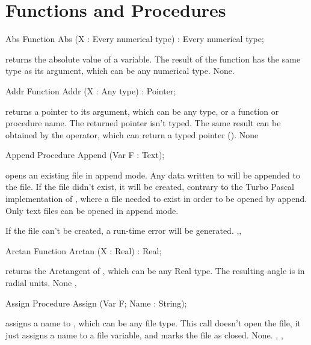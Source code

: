 \documentclass{report}
\begin{document}
\section{Functions and Procedures}
\begin{function}{Abs}
\Declaration
Function Abs (X : Every numerical type) : Every numerical type;

\Description
{} returns the absolute value of a variable. The result of the
function has the same type as its argument, which can be any numerical
type.
\Errors
None.
\SeeAlso
{}
\end{function}
\html{}
\begin{function}{Addr}
\Declaration
Function Addr (X : Any type) : Pointer;

\Description
{} returns a pointer to its argument, which can be any type, or a
function or procedure name. The returned pointer isn't typed.
The same result can be obtained by the  operator, which can return a
typed pointer (\progref).
\Errors
None
\SeeAlso
{}
\end{function}
\html{}
\begin{procedure}{Append}
\Declaration
Procedure Append (Var F : Text);

\Description
{} opens an existing file in append mode. Any data written to
 will be appended to the file. If the file didn't exist, it will be
created, contrary to the Turbo Pascal implementation of , where
a file needed to exist in order to be opened by
append.
Only text files can be opened in append mode.

\Errors
If the file can't be created, a run-time error will be generated.
\SeeAlso
{},, 
\end{procedure}
\html{}
\begin{function}{Arctan}
\Declaration
Function Arctan (X : Real) : Real;

\Description
{} returns the Arctangent of , which can be any Real type.
The resulting angle is in radial units.
\Errors
None
\SeeAlso
{}, 
\end{function}
\html{}
\begin{procedure}{Assign}
\Declaration
Procedure Assign (Var F; Name : String);

\Description
{} assigns a name to , which can be any file type.
This call doesn't open the file, it just assigns a name to a file variable,
and marks the file as closed.
\Errors
None.
\SeeAlso
{}, , 
\end{procedure}
\end{document}
